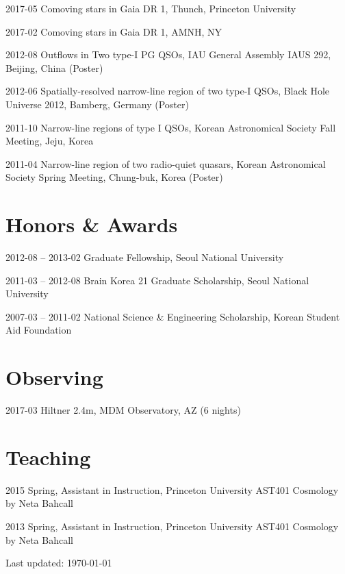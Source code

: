 \documentclass[11pt,letterpaper]{article}
\renewenvironment{itemize}{
  \begin{list}{}{
    \setlength{\leftmargin}{1.5em}
  }
}{
  \end{list}
}
\begin{document}
\begin{etaremune}
  \setlength\itemsep{0em}
  \item 2017-05 Comoving stars in Gaia DR 1, Thunch, Princeton University
  \item 2017-02 Comoving stars in Gaia DR 1, AMNH, NY
  \item 2012-08 Outflows in Two type-I PG QSOs, IAU General Assembly IAUS 292, Beijing, China (Poster)
  \item 2012-06 Spatially-resolved narrow-line region of two type-I QSOs, Black Hole Universe 2012, Bamberg, Germany (Poster)
  \item 2011-10 Narrow-line regions of type I QSOs, Korean Astronomical Society Fall Meeting, Jeju, Korea
  \item 2011-04 Narrow-line region of two radio-quiet quasars, Korean Astronomical Society Spring Meeting, Chung-buk, Korea (Poster)
\end{etaremune}

\section*{Honors \& Awards}

\begin{itemize}
  \setlength\itemsep{0em}
  \item 2012-08 -- 2013-02 Graduate Fellowship, Seoul National University
  \item 2011-03 -- 2012-08 Brain Korea 21 Graduate Scholarship, Seoul National University
  \item 2007-03 -- 2011-02 National Science \& Engineering Scholarship, Korean Student Aid Foundation
\end{itemize}

\section*{Observing}
\begin{itemize}
  \item 2017-03 Hiltner 2.4m, MDM Observatory, AZ (6 nights)
\end{itemize}

\section*{Teaching}

\begin{itemize}
  \setlength\itemsep{0em}
  \item 2015 Spring, Assistant in Instruction, Princeton University
    AST401 Cosmology by Neta Bahcall
  \item 2013 Spring, Assistant in Instruction, Princeton University
    AST401 Cosmology by Neta Bahcall
\end{itemize}

\bigskip

\begin{center}
  \begin{footnotesize}
    Last updated: \today \\
  \end{footnotesize}
\end{center}
\end{document}
